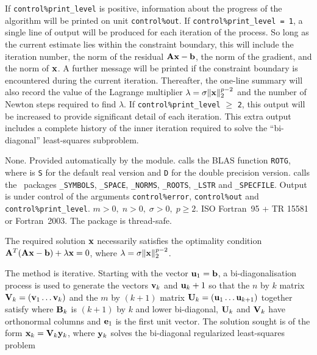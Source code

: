 \documentclass{galahad}
\newcommand{\packagename}{LS\-RT}
\begin{document}
\galinfo
If {\tt control\%print\_level} is positive, information about the progress
of the algorithm will be printed on unit {\tt control\-\%\-out}.
If {\tt control\%print\_level = 1}, a single line of output will be produced
for each iteration of the process. So long as the current estimate lies
within the constraint boundary, this will include
the iteration number, the norm of the residual ${\mathbf{A}}{\mathbf{x}}-{\mathbf{b}}$, the
norm of the gradient, and the norm of ${\mathbf{x}}$.
A further message will be printed
if the constraint boundary is encountered during the current iteration.
Thereafter, the one-line summary will also record the value of the Lagrange
multiplier $\lambda = \sigma \|{\mathbf{x}}\|_2^{p-2}$
and the number of Newton steps required to find $\lambda$.
If {\tt control\%print\_level} $\geq$ {\tt 2}, this
output will be increased to provide significant detail of each iteration.
This extra output includes a complete history of the inner iteration required
to solve the ``bi-diagonal'' least-squares subproblem.


\galgeneral

\galcommon None.
\galworkspace Provided automatically by the module.
\galroutines {\tt \packagename\_solve} calls the
BLAS function {\tt *ROTG}, where {\tt *} is {\tt S} for
the default real version and {\tt D} for the double precision version.
\galmodules {\tt \packagename\_solve} calls the \galahad\ packages
{\tt \libraryname\_SY\-M\-BOLS},
{\tt \libraryname\_SPACE},
{\tt \libraryname\_NORMS},
{\tt \libraryname\_\-ROOTS},
{\tt \libraryname\_LSTR} and
{\tt \libraryname\_SPECFILE}.
\galio Output is under control of the arguments
{\tt control\%error}, {\tt control\%out} and {\tt control\%print\_level}.
\galrestrictions $m > 0, \; n  >  0, \;  \sigma  >  0, \; p \geq 2$.
\galportability ISO Fortran~95 + TR 15581 or Fortran~2003.
The package is thread-safe.


\galmethod
The required solution ${\mathbf{x}}$ necessarily satisfies the optimality condition
${\mathbf{A}}^T ( {\mathbf{A}} {\mathbf{x}} - {\mathbf{b}} ) + \lambda {\mathbf{x}} = 0$, where
$\lambda = \sigma \|{\mathbf{x}}\|_2^{p-2}$.

\noindent
The method is iterative. Starting  with the vector ${\mathbf{u}}_1 = {\mathbf{b}}$, a
bi-diagonalisation process is used to generate the vectors ${\mathbf{v}}_k$ and
${\mathbf{u}}_k+1$ so that the $n$ by $k$ matrix ${\mathbf{V}}_k = ( {\mathbf{v}}_1 \ldots {\mathbf{v}}_k)$
and the $m$ by $(k+1)$ matrix ${\mathbf{U}}_k = ( {\mathbf{u}}_1 \ldots {\mathbf{u}}_{k+1})$
together satisfy
where ${\mathbf{B}}_k$ is $(k+1)$ by $k$ and lower bi-diagonal, ${\mathbf{U}}_k$ and
${\mathbf{V}}_k$ have orthonormal columns and ${\mathbf{e}}_1$ is the first unit vector.
The solution sought is of the form ${\mathbf{x}}_k = {\mathbf{V}}_k {\mathbf{y}}_k$, where ${\mathbf{y}}_k$
solves the bi-diagonal regularized least-squares problem
\end{document}
